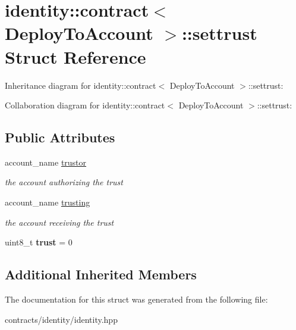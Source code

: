 \hypertarget{structidentity_1_1contract_1_1settrust}{}\section{identity\+:\+:contract$<$ Deploy\+To\+Account $>$\+:\+:settrust Struct Reference}
\label{structidentity_1_1contract_1_1settrust}


Inheritance diagram for identity\+:\+:contract$<$ Deploy\+To\+Account $>$\+:\+:settrust\+:


Collaboration diagram for identity\+:\+:contract$<$ Deploy\+To\+Account $>$\+:\+:settrust\+:
\subsection*{Public Attributes}
\begin{DoxyCompactItemize}
\item 
\mbox{\label{structidentity_1_1contract_1_1settrust_abc4e93d8e7a6a6341889378e15a78538}} 
account\+\_\+name \mbox{\hyperlink{structidentity_1_1contract_1_1settrust_abc4e93d8e7a6a6341889378e15a78538}{trustor}}
\begin{DoxyCompactList}\small\item\em the account authorizing the trust \end{DoxyCompactList}\item 
\mbox{\label{structidentity_1_1contract_1_1settrust_a33a14451c19b36acf7ce37db8f8179b7}} 
account\+\_\+name \mbox{\hyperlink{structidentity_1_1contract_1_1settrust_a33a14451c19b36acf7ce37db8f8179b7}{trusting}}
\begin{DoxyCompactList}\small\item\em the account receiving the trust \end{DoxyCompactList}\item 
\mbox{\label{structidentity_1_1contract_1_1settrust_af70d1c9f3d59d3cc2ed32a30b42a7f8c}} 
uint8\+\_\+t {\bfseries trust} = 0
\end{DoxyCompactItemize}
\subsection*{Additional Inherited Members}


The documentation for this struct was generated from the following file\+:\begin{DoxyCompactItemize}
\item 
contracts/identity/identity.\+hpp\end{DoxyCompactItemize}
